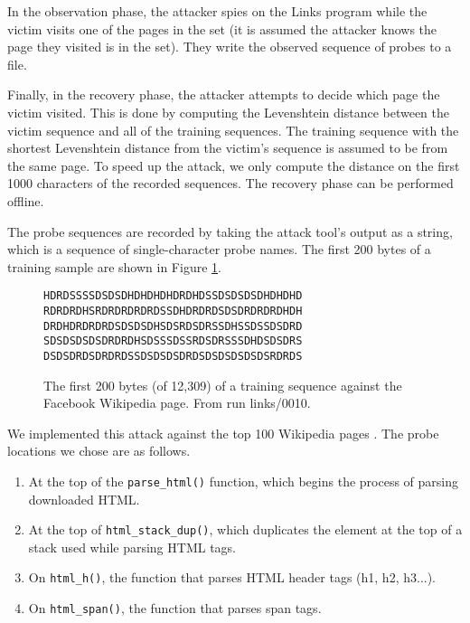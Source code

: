 \documentclass[letterpaper,twocolumn,10pt]{article}
\begin{document}
In the observation phase, the attacker spies on the Links program while the
victim visits one of the pages in the set (it is assumed the attacker knows the
page they visited is in the set). They write the observed sequence of probes to
a file.

Finally, in the recovery phase, the attacker attempts to decide which page the
victim visited. This is done by computing the Levenshtein distance
\cite{levenshtein1966binary} between the victim sequence and all of the training
sequences. The training sequence with the shortest Levenshtein distance from the
victim's sequence is assumed to be from the same page. To speed up the attack,
we only compute the distance on the first 1000 characters of the recorded
sequences. The recovery phase can be performed
offline.

The probe sequences are recorded by taking the attack tool's output as a string,
which is a sequence of single-character probe names. The first 200 bytes of
a training sample are shown in Figure \ref{figure:probetext}.

\begin{figure}
    \centering
\begin{verbatim}
HDRDSSSSDSDSDHDHDHDHDRDHDSSDSDSDSDHDHDHD
RDRDRDHSRDRDRDRDRDSSDHDRDRDSDSDRDRDRDHDH
DRDHDRDRDRDSDSDSDHSDSRDSDRSSDHSSDSSDSDRD
SDSDSDSDSDRDRDHSDSSSDSSRDSDRSSSDHDSDSDRS
DSDSDRDSDRDRDSSDSDSDSDRDSDSDSDSDSDSRDRDS
\end{verbatim}
\caption{The first 200 bytes (of 12,309) of a training sequence against the
Facebook Wikipedia page. From run links/0010.}
    \label{figure:probetext}
\end{figure}

We implemented this attack against the top 100 Wikipedia pages
\cite{wikitop2013}. The probe locations we chose are as follows.

\begin{enumerate}
    \item At the top of the \texttt{parse\_html()} function, which begins the
        process of parsing downloaded HTML.
    \item At the top of \texttt{html\_stack\_dup()}, which duplicates the element
        at the top of a stack used while parsing HTML tags.
    \item On \texttt{html\_h()}, the function that parses HTML header tags (h1,
        h2, h3...).
    \item On \texttt{html\_span()}, the function that parses span tags.
\end{enumerate}
\end{document}
